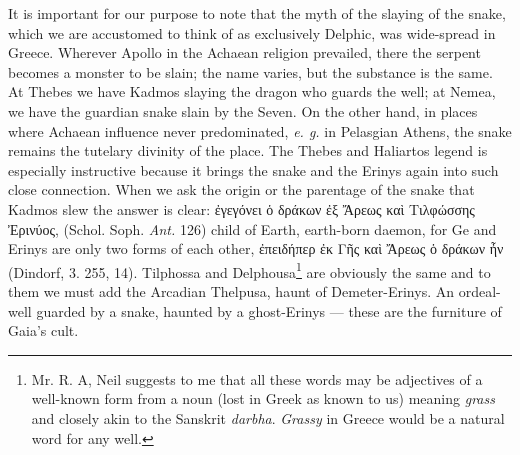 \documentclass[a4paper, 11pt, oneside, polutonikogreek, english]{article}
\begin{document}
It is important for our purpose to note that the myth of the slaying of the snake, which we are accustomed to think of as exclusively Delphic, was wide-spread in Greece. Wherever Apollo in the Achaean religion prevailed, there the serpent becomes a monster to be slain; the name varies, but the substance is the same. At Thebes we have Kadmos slaying the dragon who guards the well; at Nemea, we have the guardian snake slain by the Seven. On the other hand, in places where Achaean influence never predominated, \emph{e. g.} in Pelasgian Athens, the snake remains the tutelary divinity of the place. The Thebes and Haliartos legend is especially instructive because it brings the snake and the Erinys again into such close connection. When we ask the origin or the parentage of the snake that Kadmos slew the answer is clear: ἐγεγόνει ὁ δράκων ἐξ Ἄρεως καὶ Τιλφώσσης Ἐρινύος, (Schol. Soph. \emph{Ant.} 126) child of Earth, earth-born daemon, for Ge and Erinys are only two forms of each other, ἐπειδήπερ ἐκ Γῆς καὶ Ἄρεως ὁ δράκων ἦν (Dindorf, 3. 255, 14). Tilphossa and Delphousa\footnote{Mr. R. A, Neil suggests to me that all these words may be adjectives of a well-known form from a noun (lost in Greek as known to us) meaning \emph{grass} and closely akin to the Sanskrit \emph{darbha}. \emph{Grassy} in Greece would be a natural word for any well.} are obviously the same and to them we must add the Arcadian Thelpusa, haunt of Demeter-Erinys. An ordeal-well guarded by a snake, haunted by a ghost-Erinys --- these are the furniture of Gaia's cult.
\end{document}
